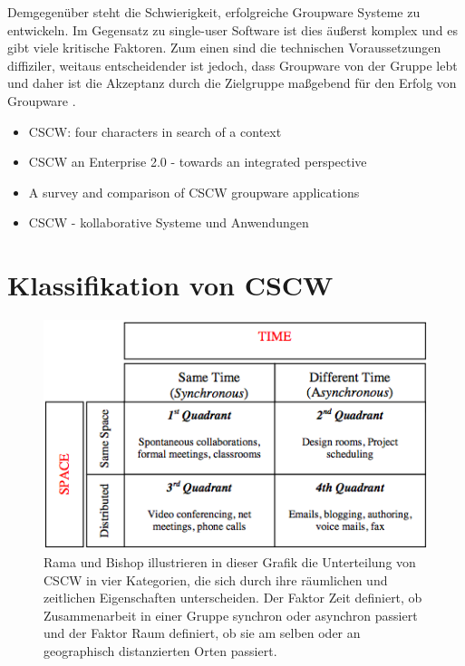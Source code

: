 	Demgegenüber steht die Schwierigkeit, erfolgreiche Groupware Systeme zu entwickeln. Im Gegensatz zu single-user Software ist dies äußerst komplex und es gibt viele kritische Faktoren. Zum einen sind die technischen Voraussetzungen diffiziler, weitaus entscheidender ist jedoch, dass Groupware von der Gruppe lebt und daher ist die Akzeptanz durch die Zielgruppe maßgebend für den Erfolg von Groupware \citep{Gerlicher:2007p241}.

\begin{itemize}
	\item {CSCW: four characters in search of a context}
	\item {CSCW an Enterprise 2.0 - towards an integrated perspective}
	\item {A survey and comparison of CSCW groupware applications}
	\item {CSCW - kollaborative Systeme und Anwendungen}
\end{itemize}

\section{Klassifikation von CSCW}


\begin{figure}[bth]
	\includegraphics[width=\textwidth]{gfx/ramaCSCWQuadranten.png}
	\caption{Rama und Bishop \citep{Rama:2006p245} illustrieren in dieser Grafik die Unterteilung von CSCW in vier Kategorien, die sich durch ihre räumlichen und zeitlichen Eigenschaften unterscheiden. Der Faktor Zeit definiert, ob Zusammenarbeit in einer Gruppe synchron oder asynchron passiert und der Faktor Raum definiert, ob sie am selben oder an geographisch distanzierten Orten passiert.}
	\label{fig:ramaCSCW}
\end{figure}


